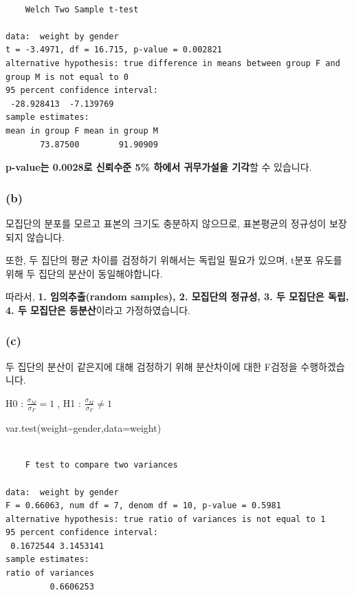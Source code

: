 \documentclass[
  a4paper,
  DIV=11,
  numbers=noendperiod]{scrreprt}
\newenvironment{Shaded}{\begin{snugshade}}{\end{snugshade}}
\newcommand{\AttributeTok}[1]{\textcolor[rgb]{0.40,0.45,0.13}{#1}}
\newcommand{\FunctionTok}[1]{\textcolor[rgb]{0.28,0.35,0.67}{#1}}
\newcommand{\NormalTok}[1]{\textcolor[rgb]{0.00,0.23,0.31}{#1}}
\newcommand{\SpecialCharTok}[1]{\textcolor[rgb]{0.37,0.37,0.37}{#1}}
\begin{document}
\begin{verbatim}

    Welch Two Sample t-test

data:  weight by gender
t = -3.4971, df = 16.715, p-value = 0.002821
alternative hypothesis: true difference in means between group F and group M is not equal to 0
95 percent confidence interval:
 -28.928413  -7.139769
sample estimates:
mean in group F mean in group M 
       73.87500        91.90909 
\end{verbatim}

\textbf{p-value는 0.0028로 신뢰수준 5\% 하에서 귀무가설을 기각}할 수
있습니다.

\subsubsection*{(b)}\label{b-4}

모집단의 분포를 모르고 표본의 크기도 충분하지 않으므로, 표본평균의
정규성이 보장되지 않습니다.

또한, 두 집단의 평균 차이를 검정하기 위해서는 독립일 필요가 있으며,
t분포 유도를 위해 두 집단의 분산이 동일해야합니다.

따라서, \textbf{1. 임의추출(random samples), 2. 모집단의 정규성, 3. 두
모집단은 독립, 4. 두 모집단은 등분산}이라고 가정하였습니다.

\subsubsection*{(c)}\label{c-2}

두 집단의 분산이 같은지에 대해 검정하기 위해 분산차이에 대한 F검정을
수행하겠습니다.

H0 : \(\frac{\sigma_M}{\sigma_F}=1\;\), H1 :
\(\frac{\sigma_M}{\sigma_F}\neq 1\)

\begin{Shaded}
\begin{Highlighting}[]
\FunctionTok{var.test}\NormalTok{(weight}\SpecialCharTok{\textasciitilde{}}\NormalTok{gender,}\AttributeTok{data=}\NormalTok{weight)}
\end{Highlighting}
\end{Shaded}

\begin{verbatim}

    F test to compare two variances

data:  weight by gender
F = 0.66063, num df = 7, denom df = 10, p-value = 0.5981
alternative hypothesis: true ratio of variances is not equal to 1
95 percent confidence interval:
 0.1672544 3.1453141
sample estimates:
ratio of variances 
         0.6606253 
\end{verbatim}
\end{document}
